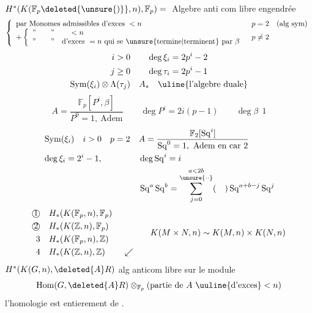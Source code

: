 
$H^*(K(\mathbb F_p\deleted{\unsure{)}},n),\mathbb F_p)={}$ Algebre anti com libre engendrée
\[
\left\{\begin{array}{ll}
\text{par Monomes admissibles d'exces }<n & p=2\quad(\text{alg sym})\\
+\left\{\begin{array}{l}\text{''}\qquad\text{''}\qquad <n\\
\text{''}\qquad\text{''}\quad\text{d'exces }=n\ \text{qui se \unsure{termine|terminent} par }\beta
\end{array}\right. &p\ne2
\end{array}\right.
\]
\[
\begin{aligned}
i>0&\qquad\deg\xi_i=2p^i-2\\
j\geq0&\qquad\deg\tau_i=2p^i-1\\
\operatorname{Sym}(\xi_i)\otimes\Lambda(\tau_j)&\quad A_*\quad\text{\uline{l'algebre duale}}
\end{aligned}
\]
\[
A=\frac{\mathbb F_p[P^i,\beta]}{P^0=1,\ \text{Adem}}
\qquad \deg P^i=2i(p-1)\qquad\deg\beta\ \ 1
\]
\[
\begin{aligned}
&\operatorname{Sym}(\xi_i)\quad i>0\quad p=2&&A=\frac{\mathbb F_2[\operatorname{Sq}^i]}{\operatorname{Sq}^0=1,\ \text{Adem en car }2}\\
&\deg\xi_i=2^i-1,&&\deg\operatorname{Sq}^i=i\\
&&&\operatorname{Sq}^a\operatorname{Sq}^b
=\overset{a<2b}{\sum_{j=0}^{\unsure{\cdot\cdot}}}(\quad)\operatorname{Sq}^{a+b-j}\operatorname{Sq}^j
\end{aligned}
\]
\[
\begin{aligned}
\text{\textcircled{1}}\quad&H_{*}(K(\mathbb F_p,n),\mathbb F_p)\\
\text{\textcircled{2}}\quad&H_{*}(K(\mathbb Z,n),\mathbb F_p)\\
3\quad&H_{*}(K(\mathbb F_p,n),\mathbb Z)\\
4\quad&H_{*}(K(\mathbb Z,n),\mathbb Z)\qquad\swarrow
\end{aligned}
\qquad K(M\times N,n)\sim K(M,n)\times K(N,n)
\]
$H^*(K(G,n),\deleted{A}R)$ alg anticom libre sur le module 
\[
\operatorname{Hom}(G,\deleted{A}R)\otimes_{\mathbb F_p}(\text{partie de } A\ \text{\uuline{d'exces}}<n)
\]
l'homologie est entierement de .

